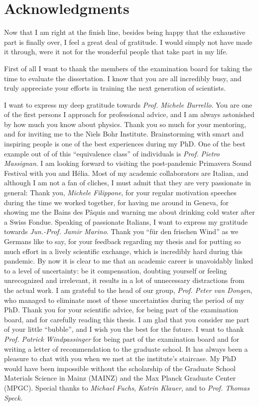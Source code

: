 \chapter*{Acknowledgments}
Now that I am right at the finish line, besides being happy that the exhaustive part is finally over, I feel a great deal of gratitude.
I would simply not have made it through, were it not for the wonderful people that take part in my life.

First of all I want to thank the members of the examination board for taking the time to evaluate the dissertation.
I know that you are all incredibly busy, and truly appreciate your efforts in training the next generation of scientists.

I want to express my deep gratitude towards {\it Prof. Michele Burrello}.
You are one of the first persons I approach for professional advice, and I am always astonished by how much you know about physics.
Thank you so much for your mentoring, and for inviting me to the Niels Bohr Institute.
Brainstorming with smart and inspiring people is one of the best experiences during my PhD.
One of the best example out of of this ``equivalence class'' of individuals is {\it Prof. Pietro Massignan}.
I am looking forward to visiting the post-pandemic Primavera Sound Festival with you and Hélia.
Most of my academic collaborators are Italian, and although I am not a fan of cliches, I must admit that they are very passionate in general:
Thank you, {\it Michele Filippone}, for your regular motivation speeches during the time we worked together, for having me around in Geneva, for showing me the Bains des Pâquis and warning me about drinking cold water after a Swiss Fondue.
Speaking of passionate Italians, I want to express my gratitude towards {\it Jun.-Prof. Jamir Marino}.
Thank you ``für den frischen Wind'' as we Germans like to say, for your feedback regarding my thesis and for putting so much effort in a lively scientific exchange, which is incredibly hard during this pandemic.
By now it is clear to me that an academic career is unavoidably linked to a level of uncertainty: be it compensation, doubting yourself or feeling unrecognized and irrelevant, it results in a lot of unnecessary distractions from the actual work.
I am grateful to the head of our group, {\it Prof. Peter van Dongen}, who managed to eliminate most of these uncertainties during the period of my PhD.
Thank you for your scientific advice, for being part of the examination board, and for carefully reading this thesis.
I am glad that you consider me part of your little ``bubble'', and I wish you the best for the future.
I want to thank {\it Prof. Patrick Windpassinger} for being part of the examination board and for writing a letter of recommendation to the graduate school.
It has always been a pleasure to chat with you when we met at the institute's staircase.
My PhD would have been impossible without the scholarship of the Graduate School Materials Science in Mainz (MAINZ) and the Max Planck Graduate Center (MPGC).
Special thanks to {\it Michael Fuchs}, {\it Katrin Klauer}, and to {\it Prof. Thomas Speck}.

